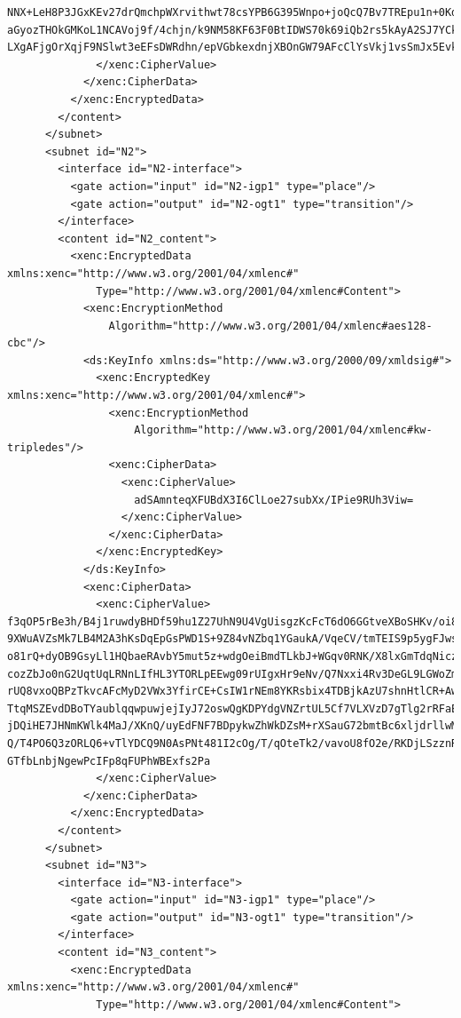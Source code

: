 \begin{lstlisting}
NNX+LeH8P3JGxKEv27drQmchpWXrvithwt78csYPB6G395Wnpo+joQcQ7Bv7TREpu1n+0KdydZ3K
aGyozTHOkGMKoL1NCAVoj9f/4chjn/k9NM58KF63F0BtIDWS70k69iQb2rs5kAyA2SJ7YCkE6OI3
LXgAFjgOrXqjF9NSlwt3eEFsDWRdhn/epVGbkexdnjXBOnGW79AFcClYsVkj1vsSmJx5EvkvIw==
              </xenc:CipherValue>
            </xenc:CipherData>
          </xenc:EncryptedData>
        </content>
      </subnet>
      <subnet id="N2">
        <interface id="N2-interface">
          <gate action="input" id="N2-igp1" type="place"/>
          <gate action="output" id="N2-ogt1" type="transition"/>
        </interface>
        <content id="N2_content">
          <xenc:EncryptedData xmlns:xenc="http://www.w3.org/2001/04/xmlenc#" 
              Type="http://www.w3.org/2001/04/xmlenc#Content">
            <xenc:EncryptionMethod 
                Algorithm="http://www.w3.org/2001/04/xmlenc#aes128-cbc"/>
            <ds:KeyInfo xmlns:ds="http://www.w3.org/2000/09/xmldsig#">
              <xenc:EncryptedKey xmlns:xenc="http://www.w3.org/2001/04/xmlenc#">
                <xenc:EncryptionMethod 
                    Algorithm="http://www.w3.org/2001/04/xmlenc#kw-tripledes"/>
                <xenc:CipherData>
                  <xenc:CipherValue>
                    adSAmnteqXFUBdX3I6ClLoe27subXx/IPie9RUh3Viw=
                  </xenc:CipherValue>
                </xenc:CipherData>
              </xenc:EncryptedKey>
            </ds:KeyInfo>
            <xenc:CipherData>
              <xenc:CipherValue>
f3qOP5rBe3h/B4j1ruwdyBHDf59hu1Z27UhN9U4VgUisgzKcFcT6dO6GGtveXBoSHKv/oi8ZVCsS
9XWuAVZsMk7LB4M2A3hKsDqEpGsPWD1S+9Z84vNZbq1YGaukA/VqeCV/tmTEIS9p5ygFJwszS9Ri
o81rQ+dyOB9GsyLl1HQbaeRAvbY5mut5z+wdgOeiBmdTLkbJ+WGqv0RNK/X8lxGmTdqNiczWvHQ7
cozZbJo0nG2UqtUqLRNnLIfHL3YTORLpEEwg09rUIgxHr9eNv/Q7Nxxi4Rv3DeGL9LGWoZm2F8a6
rUQ8vxoQBPzTkvcAFcMyD2VWx3YfirCE+CsIW1rNEm8YKRsbix4TDBjkAzU7shnHtlCR+AwSF24V
TtqMSZEvdDBoTYaublqqwpuwjejIyJ72oswQgKDPYdgVNZrtUL5Cf7VLXVzD7gTlg2rRFaEPUlID
jDQiHE7JHNmKWlk4MaJ/XKnQ/uyEdFNF7BDpykwZhWkDZsM+rXSauG72bmtBc6xljdrllwMtE9pV
Q/T4PO6Q3zORLQ6+vTlYDCQ9N0AsPNt481I2cOg/T/qOteTk2/vavoU8fO2e/RKDjLSzznRe52aV
GTfbLnbjNgewPcIFp8qFUPhWBExfs2Pa
              </xenc:CipherValue>
            </xenc:CipherData>
          </xenc:EncryptedData>
        </content>
      </subnet>
      <subnet id="N3">
        <interface id="N3-interface">
          <gate action="input" id="N3-igp1" type="place"/>
          <gate action="output" id="N3-ogt1" type="transition"/>
        </interface>
        <content id="N3_content">
          <xenc:EncryptedData xmlns:xenc="http://www.w3.org/2001/04/xmlenc#" 
              Type="http://www.w3.org/2001/04/xmlenc#Content">

\end{lstlisting}
